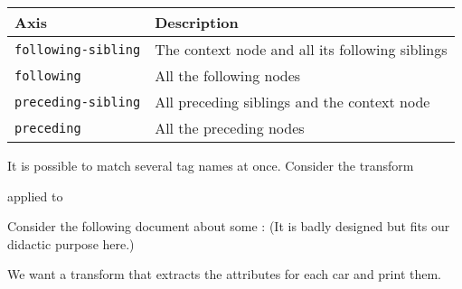 %
\begin{slide}
 
\raggedslides[0pt]

\begin{center}
\begin{tabular}{ll}
\toprule
Axis & Description\\
\midrule
\texttt{following-sibling} 
                    & The context node and all its following siblings\\ 
\texttt{following}  & All the following nodes\\
\texttt{preceding-sibling}
                    & All preceding siblings and the context node\\
\texttt{preceding}  & All the preceding nodes\\
\bottomrule
\end{tabular}
\end{center}

\end{slide}


%
\begin{slide}
 
\raggedslides[0pt]

It is possible to match several tag names at once. Consider 
the transform

\end{slide}


%
\begin{slide}
 
\raggedslides[0pt]

applied to 

\end{slide}


%
\begin{slide}
\label{cars1}
\hypertarget{hyper:cars1}{}

\raggedslides[0pt]

Consider the following document about some :
(It is badly designed but fits our didactic purpose here.)

We want a transform that extracts the attributes for each car and
print them.

\end{slide}


